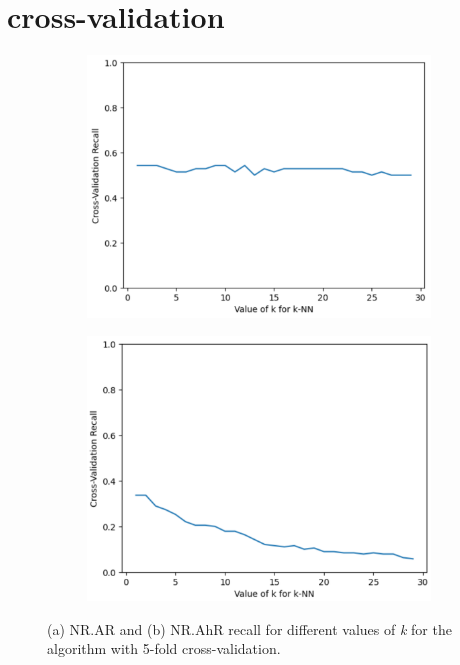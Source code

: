 
\clearpage
{}
\section{\kNN{} cross-validation}
\label{appendix:k_CV}

\begin{figure}[h]
  \centering
	 \begin{subfigure}[b]{0.48\textwidth}
 		 \centering
 		 \includegraphics[width=\textwidth]{include/img/NR_AR_k.png}
 		 \caption{}
 	\end{subfigure}
 	\hfill
 		 \begin{subfigure}[b]{0.48\textwidth}
 		 \centering
 		 \includegraphics[width=\textwidth]{include/img/NR_AhR_k.png}
 		 \caption{}
 	\end{subfigure}
  \caption{(a) NR.AR and (b) NR.AhR recall for different values of \textit{k} for the \kNN{} algorithm with 5-fold cross-validation.}
  \label{fig:k_values}
\end{figure}



